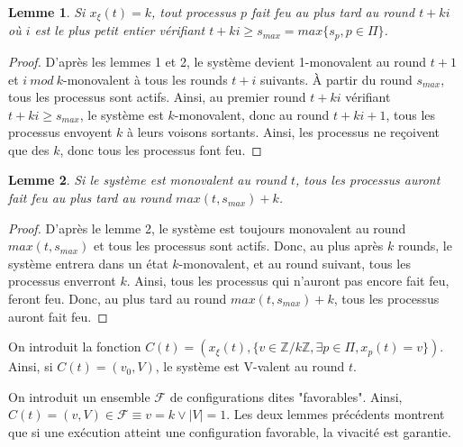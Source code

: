 \documentclass{article}
\newtheorem{lemma}{Lemme}
\begin{document}
\begin{lemma}
	Si $x_\xi(t) = k$, tout processus $p$ fait feu au plus tard au round $t+k i$ où $i$ est le plus petit entier vérifiant $t+k i \geq s_{max} = max \{s_p, p \in \Pi\}$.
\end{lemma}
\begin{proof}
	D'après les lemmes 1 et 2, le système devient 1-monovalent au round $t+1$ et $i~mod~k$-monovalent à tous les rounds $t+i$ suivants.
	À partir du round $s_{max}$, tous les processus sont actifs.
	Ainsi, au premier round $t+k i$ vérifiant $t+k i \geq s_{max}$, le système est $k$-monovalent, donc au round $t+k i +1$, tous les processus envoyent $k$ à leurs voisons sortants.
	Ainsi, les processus ne reçoivent que des $k$, donc tous les processus font feu.
\end{proof}

\begin{lemma}
	Si le système est monovalent au round $t$, tous les processus auront fait feu au plus tard au round $max(t, s_{max})+k$.
\end{lemma}
\begin{proof}
	D'après le lemme 2, le système est toujours monovalent au round $max(t, s_{max})$ et tous les processus sont actifs.
	Donc, au plus après $k$ rounds, le système entrera dans un état $k$-monovalent, et au round suivant, tous les processus enverront $k$.
	Ainsi, tous les processus qui n'auront pas encore fait feu, feront feu.
	Donc, au plus tard au round $max(t, s_{max})+k$, tous les processus auront fait feu.
\end{proof}

On introduit la fonction $C(t) = (x_\xi(t), \{v \in \mathds{Z}/k\mathds{Z}, \exists p \in \Pi, x_p(t) = v\})$.
Ainsi, si $C(t) = (v_0, V)$, le système est V-valent au round $t$.

On introduit un ensemble $\mathcal{F}$ de configurations dites "favorables".
Ainsi, $C(t) = (v, V) \in \mathcal{F} \equiv v = k \vee |V| = 1$.
Les deux lemmes précédents montrent que si une exécution atteint une configuration favorable, la vivacité est garantie.
\end{document}
